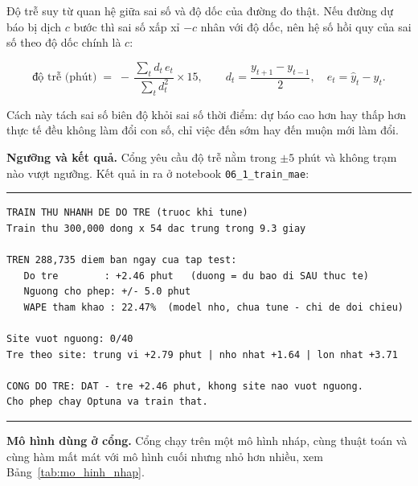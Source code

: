 \documentclass[12pt, a4paper]{report}
\begin{document}
Độ trễ suy từ quan hệ giữa sai số và độ dốc của đường đo thật. Nếu đường dự báo bị dịch
$c$ bước thì sai số xấp xỉ $-c$ nhân với độ dốc, nên hệ số hồi quy của sai số theo độ dốc
chính là $c$:

\begin{equation}
\text{độ trễ (phút)} \;=\; -\,\frac{\sum_t d_t \, e_t}{\sum_t d_t^{2}} \times 15,
\qquad
d_t = \frac{y_{t+1} - y_{t-1}}{2}, \quad e_t = \hat{y}_t - y_t .
\end{equation}

Cách này tách sai số biên độ khỏi sai số thời điểm: dự báo cao hơn hay thấp hơn thực tế
đều không làm đổi con số, chỉ việc đến sớm hay đến muộn mới làm đổi.

\textbf{Ngưỡng và kết quả.} Cổng yêu cầu độ trễ nằm trong $\pm 5$ phút và không trạm nào vượt
ngưỡng. Kết quả in ra ở notebook \texttt{06\_1\_train\_mae}:

\begingroup
\par\vspace{6pt}\hrule\vspace{4pt}
\small\renewcommand{\baselinestretch}{1.0}\selectfont
\begin{verbatim}
TRAIN THU NHANH DE DO TRE (truoc khi tune)
Train thu 300,000 dong x 54 dac trung trong 9.3 giay

TREN 288,735 diem ban ngay cua tap test:
   Do tre        : +2.46 phut   (duong = du bao di SAU thuc te)
   Nguong cho phep: +/- 5.0 phut
   WAPE tham khao : 22.47%  (model nho, chua tune - chi de doi chieu)

Site vuot nguong: 0/40
Tre theo site: trung vi +2.79 phut | nho nhat +1.64 | lon nhat +3.71

CONG DO TRE: DAT - tre +2.46 phut, khong site nao vuot nguong.
Cho phep chay Optuna va train that.
\end{verbatim}
\vspace{2pt}\hrule\par\vspace{6pt}
\endgroup

\textbf{Mô hình dùng ở cổng.} Cổng chạy trên một mô hình nháp, cùng thuật toán và cùng hàm
mất mát với mô hình cuối nhưng nhỏ hơn nhiều, xem Bảng~\ref{tab:mo_hinh_nhap}.
\end{document}

